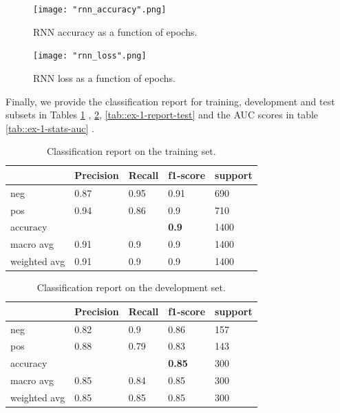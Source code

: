 \documentclass[10pt, a4paper]{article}
\begin{document}
    \begin{figure}
		\centering
		\texttt{[image: "rnn\_accuracy".png]}
		\caption{RNN accuracy as a function of epochs.}
		\label{fig::rnn_accuracy}
	\end{figure}
	
	\begin{figure}
		\centering
		\texttt{[image: "rnn\_loss".png]}
		\caption{RNN loss as a function of epochs.}
		\label{fig::rnn_loss}
	\end{figure}



    Finally, we provide the classification report for training, development and test subsets in Tables \ref{tab::ex-1-report-train} , \ref{tab::ex-1-report-dev}, \ref{tab::ex-1-report-test} and the AUC scores in table \ref{tab::ex-1-stats-auc} .

    \begin{table}
		\begin{tabular}{|l|l|l|l|l|}
			\hline
			\cellcolor{blue!25}\textbf{} & \cellcolor{blue!25}\textbf{Precision} &
			\cellcolor{blue!25}\textbf{Recall}  &
			\cellcolor{blue!25}\textbf{f1-score}  &
			\cellcolor{blue!25}\textbf{support}\\
			\hline
			neg & 0.87 & 0.95 & 0.91 & 690 \\\hline
			pos & 0.94  & 0.86 & 0.9 & 710 \\\hline
			accuracy & & & \textbf{0.9} & 1400 \\\hline
            macro avg & 0.91 & 0.9 & 0.9 & 1400 \\\hline
            weighted avg & 0.91 & 0.9 & 0.9 & 1400 \\\hline
            
		\end{tabular}
		\centering
		\caption{Classification report on the training set.}
		\label{tab::ex-1-report-train}
	\end{table}

 \begin{table}
		\begin{tabular}{|l|l|l|l|l|}
			\hline
			\cellcolor{blue!25}\textbf{} & \cellcolor{blue!25}\textbf{Precision} &
			\cellcolor{blue!25}\textbf{Recall}  &
			\cellcolor{blue!25}\textbf{f1-score}  &
			\cellcolor{blue!25}\textbf{support}\\
			\hline
			neg & 0.82 & 0.9 & 0.86 & 157 \\\hline
			pos & 0.88  & 0.79 & 0.83 & 143 \\\hline
			accuracy & & & \textbf{0.85} & 300 \\\hline
            macro avg & 0.85 & 0.84 & 0.85 & 300 \\\hline
            weighted avg & 0.85 & 0.85 & 0.85 & 300 \\\hline
            
		\end{tabular}
		\centering
		\caption{Classification report on the development set.}
		\label{tab::ex-1-report-dev}
	\end{table}
\end{document}
